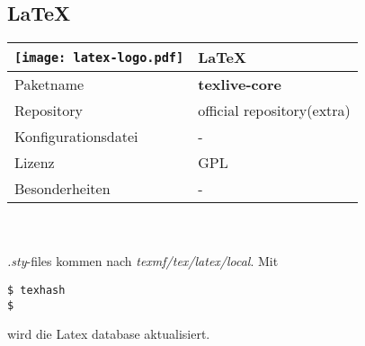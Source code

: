 \subsection{\LaTeX}
\begin{tabular}{l|l}
\texttt{[image: latex-logo.pdf]} & \LaTeX \\ \hline
Paketname & \textbf{texlive-core} \\ 
Repository & official repository(extra) \\
Konfigurationsdatei & - \\
Lizenz & GPL \\
Besonderheiten & - \\
\end{tabular}
\\ \\
\emph{.sty}-files kommen nach \emph{texmf/tex/latex/local}.
Mit 
\begin{lstlisting}[style=Bash, frame=none]
$ texhash
$
\end{lstlisting}
wird die Latex database aktualisiert.
